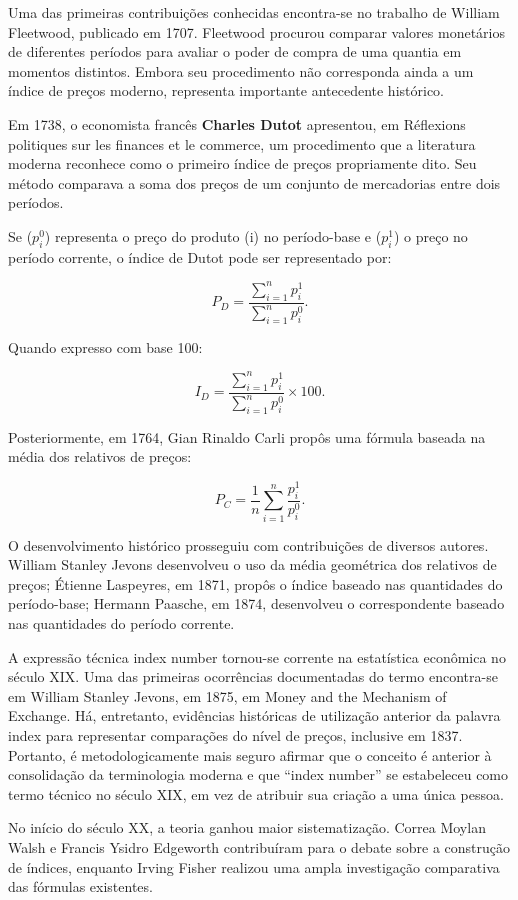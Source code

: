 Uma das primeiras contribuições conhecidas encontra-se no trabalho de William Fleetwood, publicado em 1707. Fleetwood procurou comparar valores monetários de diferentes períodos para avaliar o poder de compra de uma quantia em momentos distintos. Embora seu procedimento não corresponda ainda a um índice de preços moderno, representa importante antecedente histórico. \vskip0.3cm

Em 1738, o economista francês \textbf{Charles Dutot} apresentou, em Réflexions politiques sur les finances et le commerce, um procedimento que a literatura moderna reconhece como o primeiro índice de preços propriamente dito. Seu método comparava a soma dos preços de um conjunto de mercadorias entre dois períodos. \vskip0.3cm

Se ($p_i^0$) representa o preço do produto (i) no período-base e ($p_i^1$) o preço no período corrente, o índice de Dutot pode ser representado por:

$$
P_D=
\frac{\sum_{i=1}^{n}p_i^1}
{\sum_{i=1}^{n}p_i^0}.
$$

Quando expresso com base 100:

$$
I_D=
\frac{\sum_{i=1}^{n}p_i^1}
{\sum_{i=1}^{n}p_i^0}
\times100.
$$

Posteriormente, em 1764, Gian Rinaldo Carli propôs uma fórmula baseada na média dos relativos de preços:

$$
P_C=
\frac{1}{n}
\sum_{i=1}^{n}
\frac{p_i^1}{p_i^0}.
$$

O desenvolvimento histórico prosseguiu com contribuições de diversos autores. William Stanley Jevons desenvolveu o uso da média geométrica dos relativos de preços; Étienne Laspeyres, em 1871, propôs o índice baseado nas quantidades do período-base; Hermann Paasche, em 1874, desenvolveu o correspondente baseado nas quantidades do período corrente. \vskip0.3cm

A expressão técnica index number tornou-se corrente na estatística econômica no século XIX. Uma das primeiras ocorrências documentadas do termo encontra-se em William Stanley Jevons, em 1875, em Money and the Mechanism of Exchange. Há, entretanto, evidências históricas de utilização anterior da palavra index para representar comparações do nível de preços, inclusive em 1837. Portanto, é metodologicamente mais seguro afirmar que o conceito é anterior à consolidação da terminologia moderna e que “index number” se estabeleceu como termo técnico no século XIX, em vez de atribuir sua criação a uma única pessoa. \vskip0.3cm


No início do século XX, a teoria ganhou maior sistematização. Correa Moylan Walsh e Francis Ysidro Edgeworth contribuíram para o debate sobre a construção de índices, enquanto Irving Fisher realizou uma ampla investigação comparativa das fórmulas existentes. \vskip0.3cm

